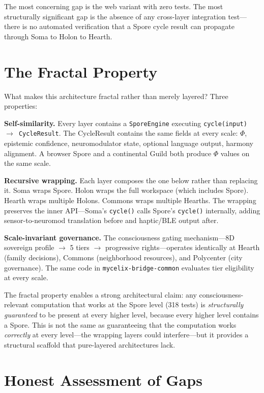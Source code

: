 \documentclass[11pt,twocolumn]{article}
\begin{document}
The most concerning gap is the web variant with zero tests. The most structurally significant gap is the absence of any cross-layer integration test---there is no automated verification that a Spore cycle result can propagate through Soma to Holon to Hearth.

\section{The Fractal Property}
\label{sec:fractal}

What makes this architecture fractal rather than merely layered? Three properties:

\textbf{Self-similarity.} Every layer contains a \texttt{SporeEngine} executing \texttt{cycle(input) $\to$ CycleResult}. The CycleResult contains the same fields at every scale: $\Phi$, epistemic confidence, neuromodulator state, optional language output, harmony alignment. A browser Spore and a continental Guild both produce $\Phi$ values on the same scale.

\textbf{Recursive wrapping.} Each layer composes the one below rather than replacing it. Soma wraps Spore. Holon wraps the full workspace (which includes Spore). Hearth wraps multiple Holons. Commons wraps multiple Hearths. The wrapping preserves the inner API---Soma's \texttt{cycle()} calls Spore's \texttt{cycle()} internally, adding sensor-to-neuromod translation before and haptic/BLE output after.

\textbf{Scale-invariant governance.} The consciousness gating mechanism---8D sovereign profile $\to$ 5 tiers $\to$ progressive rights---operates identically at Hearth (family decisions), Commons (neighborhood resources), and Polycenter (city governance). The same code in \texttt{mycelix-bridge-common} evaluates tier eligibility at every scale.

The fractal property enables a strong architectural claim: any consciousness-relevant computation that works at the Spore level (318 tests) is \textit{structurally guaranteed} to be present at every higher level, because every higher level contains a Spore. This is not the same as guaranteeing that the computation works \textit{correctly} at every level---the wrapping layers could interfere---but it provides a structural scaffold that pure-layered architectures lack.

\section{Honest Assessment of Gaps}
\label{sec:gaps}
\end{document}
